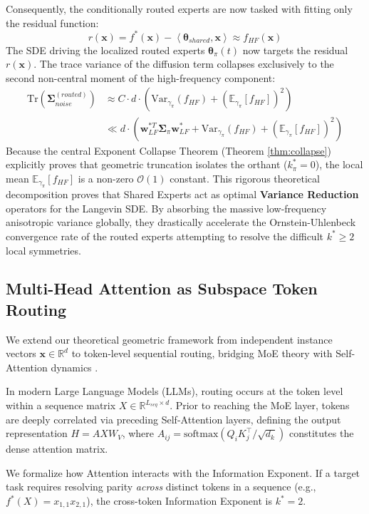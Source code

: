\documentclass{article}
\newcommand{\E}{\mathbb{E}}
\newcommand{\R}{\mathbb{R}}
\newcommand{\1}{\mathbb{I}}
\newcommand{\inner}[2]{\left\langle#1, #2\right\rangle}
\newcommand{\calO}{\mathcal{O}}
\newcommand{\bx}{\mathbf{x}}
\newcommand{\bw}{\mathbf{w}}
\newcommand{\btheta}{\boldsymbol{\theta}}
\newcommand{\bSigma}{\boldsymbol{\Sigma}}
\newcommand{\Tr}{\mathrm{Tr}}
\newcommand{\Var}{\mathrm{Var}}
\begin{document}
Consequently, the conditionally routed experts are now tasked with fitting only the residual function:
\begin{equation}
    r(\bx) = f^*(\bx) - \inner{\btheta_{shared}}{\bx} \approx f_{HF}(\bx)
\end{equation}
The SDE driving the localized routed experts $\btheta_\pi(t)$ now targets the residual $r(\bx)$. The trace variance of the diffusion term collapses exclusively to the second non-central moment of the high-frequency component:
\begin{align}
    \Tr(\bSigma_{noise}^{(routed)}) &\approx C \cdot d \cdot \left( \Var_{\gamma_\pi}(f_{HF}) + (\E_{\gamma_\pi}[f_{HF}])^2 \right) \\
    &\ll d \cdot \left( \bw_{LF}^{*T} \bSigma_\pi \bw_{LF}^* + \Var_{\gamma_\pi}(f_{HF}) + (\E_{\gamma_\pi}[f_{HF}])^2 \right)
\end{align}
Because the central Exponent Collapse Theorem (Theorem \ref{thm:collapse}) explicitly proves that geometric truncation isolates the orthant ($k_\pi^* = 0$), the local mean $\E_{\gamma_\pi}[f_{HF}]$ is a non-zero $\calO(1)$ constant. This rigorous theoretical decomposition proves that Shared Experts act as optimal \textbf{Variance Reduction} operators \citep{kushner2003stochastic} for the Langevin SDE. By absorbing the massive low-frequency anisotropic variance globally, they drastically accelerate the Ornstein-Uhlenbeck convergence rate of the routed experts attempting to resolve the difficult $k^* \ge 2$ local symmetries.

\subsection{Multi-Head Attention as Subspace Token Routing}
\label{app:attention_exponent}

We extend our theoretical geometric framework from independent instance vectors $\bx \in \R^d$ to token-level sequential routing, bridging MoE theory with Self-Attention dynamics \citep{vaswani2017attention}.

In modern Large Language Models (LLMs), routing occurs at the token level within a sequence matrix $X \in \R^{L_{seq} \times d}$. Prior to reaching the MoE layer, tokens are deeply correlated via preceding Self-Attention layers, defining the output representation $H = A X W_V$, where $A_{ij} = \text{softmax}(Q_i K_j^\top / \sqrt{d_k})$ constitutes the dense attention matrix. 

We formalize how Attention interacts with the Information Exponent. If a target task requires resolving parity \textit{across} distinct tokens in a sequence (e.g., $f^*(X) = x_{1,1} x_{2,1}$), the cross-token Information Exponent is $k^* = 2$. 
\end{document}
